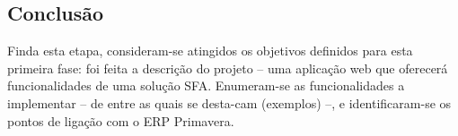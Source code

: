 \begin{titlepage}
\section{Conclusão}
\justify\normalsize
Finda esta etapa, consideram-se atingidos os objetivos definidos para esta primeira fase: foi feita a descrição do projeto – uma aplicação web que oferecerá funcionalidades de uma solução SFA. Enumeram-se as funcionalidades a implementar – de entre as quais se desta-cam (exemplos) –, e identificaram-se os pontos de ligação com o ERP Primavera.




\end{titlepage}
